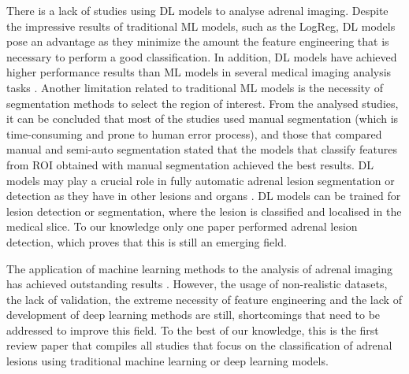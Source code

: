 \documentclass[11pt]{article}
\begin{document}
There is a lack of studies using DL models to analyse adrenal imaging. Despite
the impressive results of traditional ML models, such as the LogReg, DL models
pose an advantage as they minimize the amount the feature engineering that is
necessary to perform a good classification. In addition, DL models have achieved
higher performance results than ML models in several medical imaging analysis
tasks \cite{Suganyadevi2022}. Another limitation related to traditional ML
models is the necessity of segmentation methods to select the region of
interest. From the analysed studies, it can be concluded that most of the
studies used manual segmentation (which is time-consuming and prone to human
error process), and those that compared manual and semi-auto segmentation stated
that the models that classify features from ROI obtained with manual
segmentation achieved the best results. DL models may play a crucial role in fully
automatic adrenal lesion segmentation or detection as they have in other lesions
and organs \cite{Suganyadevi2022}. DL models can be trained for lesion detection
or segmentation, where the lesion is classified and localised in the medical
slice. To our knowledge only one paper performed adrenal lesion detection, which
proves that this is still an emerging field.

The application of machine learning methods to the analysis of adrenal imaging
has achieved outstanding results
\cite{Schieda2017,Yi20181,Yi2018,Kusunoki2022,Barstugan2020}. However, the usage
of non-realistic datasets, the lack of validation, the extreme necessity of
feature engineering and the lack of development of deep learning methods are
still, shortcomings that need to be addressed to improve this field. To the best
of our knowledge, this is the first review paper that compiles all studies that
focus on the classification of adrenal lesions using traditional machine
learning or deep learning models.


\printbibliography
\end{document}
